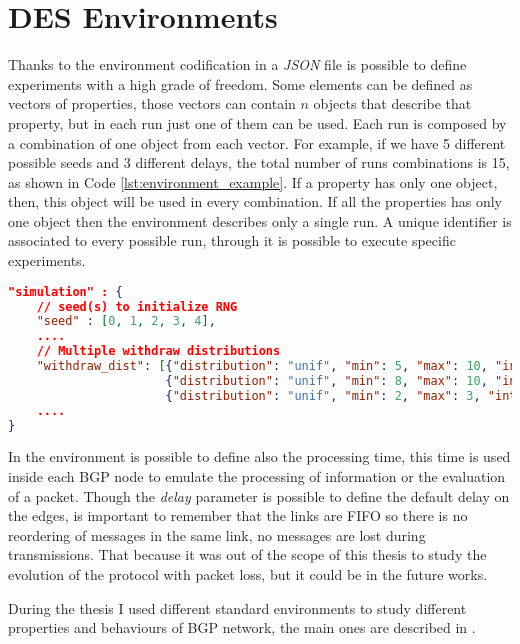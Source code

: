 \section{DES Environments}
\label{sec:des_environment}

Thanks to the environment codification in a \textit{JSON} file is possible to
define experiments with a high grade of freedom.
Some elements can be defined as vectors of properties, those vectors can
contain $n$ objects that describe that property, but in each run just one
of them can be used.
Each run is composed by a combination of one object from each vector.
For example, if we have \num{5} different
possible seeds and \num{3} different delays, the total number of runs combinations
is \num{15}, as shown in Code \ref{lst:environment_example}.
If a property has only one object, then, this object will be used in every
combination.
If all the properties has only one object then the environment describes only
a single run.
A unique identifier is associated to every possible run, through it is possible
to execute specific experiments.

\begin{lstlisting}[language=json, caption=Environment example, label=lst:environment_example]
"simulation" : {
    // seed(s) to initialize RNG
    "seed" : [0, 1, 2, 3, 4],
    ....
    // Multiple withdraw distributions
    "withdraw_dist": [{"distribution": "unif", "min": 5, "max": 10, "int": 0.1},
                      {"distribution": "unif", "min": 8, "max": 10, "int": 0.1},
                      {"distribution": "unif", "min": 2, "max": 3, "int": 0.1}],
    ....
}
\end{lstlisting}

In the environment is possible to define also the processing time, this time is used
inside each \ac{BGP} node to emulate the processing of information or the evaluation
of a packet.
Though the \textit{delay} parameter is possible to define the default delay on the edges,
is important to remember that the links are FIFO so there is no reordering
of messages in the same link, no messages are lost during transmissions.
That because it was out of the scope of this thesis to study the evolution
of the protocol with packet loss, but it could be in the future works.

During the thesis I used different standard environments to study different
properties and behaviours of \ac{BGP} network, the main ones are described in
.

